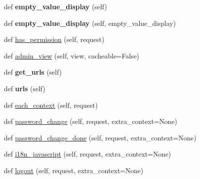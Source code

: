 \begin{DoxyCompactItemize}
\item 
\mbox{\label{classdjango_1_1contrib_1_1admin_1_1sites_1_1_admin_site_a379b0c61c602e9554279d769328c2842}} 
def {\bfseries empty\+\_\+value\+\_\+display} (self)
\item 
\mbox{\label{classdjango_1_1contrib_1_1admin_1_1sites_1_1_admin_site_a78602a194485ad2f0ff0315c84b011f0}} 
def {\bfseries empty\+\_\+value\+\_\+display} (self, empty\+\_\+value\+\_\+display)
\item 
def \mbox{\hyperlink{classdjango_1_1contrib_1_1admin_1_1sites_1_1_admin_site_a819e45e7b85134938b9062037ad0e5cb}{has\+\_\+permission}} (self, request)
\item 
def \mbox{\hyperlink{classdjango_1_1contrib_1_1admin_1_1sites_1_1_admin_site_ad3ba68804e29ed2ad9fb5230fc246c83}{admin\+\_\+view}} (self, view, cacheable=False)
\item 
\mbox{\label{classdjango_1_1contrib_1_1admin_1_1sites_1_1_admin_site_a8da6fce50427f7e2f99ed13dc21c14e3}} 
def {\bfseries get\+\_\+urls} (self)
\item 
\mbox{\label{classdjango_1_1contrib_1_1admin_1_1sites_1_1_admin_site_a9e2b3157bb62860bdd7708bdd64719df}} 
def {\bfseries urls} (self)
\item 
def \mbox{\hyperlink{classdjango_1_1contrib_1_1admin_1_1sites_1_1_admin_site_a9827cf8301d5677e42aa917686ac0af8}{each\+\_\+context}} (self, request)
\item 
def \mbox{\hyperlink{classdjango_1_1contrib_1_1admin_1_1sites_1_1_admin_site_aa789f8743e04abc4ce7c9870853d3346}{password\+\_\+change}} (self, request, extra\+\_\+context=None)
\item 
def \mbox{\hyperlink{classdjango_1_1contrib_1_1admin_1_1sites_1_1_admin_site_a64925f87f79cfb87c5015f34c6263d45}{password\+\_\+change\+\_\+done}} (self, request, extra\+\_\+context=None)
\item 
def \mbox{\hyperlink{classdjango_1_1contrib_1_1admin_1_1sites_1_1_admin_site_ab5e74c0d0b6714222e00d6e5897a1543}{i18n\+\_\+javascript}} (self, request, extra\+\_\+context=None)
\item 
def \mbox{\hyperlink{classdjango_1_1contrib_1_1admin_1_1sites_1_1_admin_site_a22c721dd725e51e860e50b27aeda60ce}{logout}} (self, request, extra\+\_\+context=None)

\end{DoxyCompactItemize}
